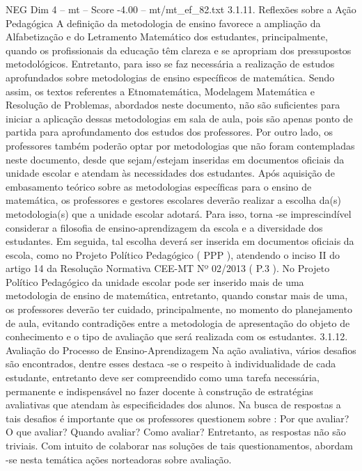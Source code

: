 \begin{textsample}{NEG Dim 4 – mt – Score -4.00 – mt/mt\_ef\_82.txt}  \label{ex:f4_neg_112}
3.1.11.
Reflexões sobre a Ação Pedagógica A definição da metodologia de ensino favorece a ampliação da Alfabetização e do Letramento Matemático dos estudantes, principalmente, quando os profissionais da educação têm clareza e se apropriam dos pressupostos metodológicos.
Entretanto, para isso se faz necessária a realização de estudos aprofundados sobre metodologias de ensino específicos de matemática.
Sendo assim, os textos referentes a Etnomatemática, Modelagem Matemática e Resolução de Problemas, abordados neste documento, não são suficientes para iniciar a aplicação dessas metodologias em sala de aula, pois são apenas ponto de partida para aprofundamento dos estudos dos professores.
Por outro lado, os professores também poderão optar por metodologias que não foram contempladas neste documento, desde que sejam/estejam inseridas em documentos oficiais da unidade escolar e atendam às necessidades dos estudantes.
Após aquisição de embasamento teórico sobre as metodologias específicas para o ensino de matemática, os professores e gestores escolares deverão realizar a escolha da(s) metodologia(s) que a unidade escolar adotará.
Para isso, torna -se imprescindível considerar a filosofia de ensino-aprendizagem da escola e a diversidade dos estudantes.
Em seguida, tal escolha deverá ser inserida em documentos oficiais da escola, como no Projeto Político Pedagógico ( PPP ), atendendo o inciso II do artigo 14 da Resolução Normativa CEE-MT Nº 02/2013 ( P.3 ).
No Projeto Político Pedagógico da unidade escolar pode ser inserido mais de uma metodologia de ensino de matemática, entretanto, quando constar mais de uma, os professores deverão ter cuidado, principalmente, no momento do planejamento de aula, evitando contradições entre a metodologia de apresentação do objeto de conhecimento e o tipo de avaliação que será realizada com os estudantes. 3.1.12.
Avaliação do Processo de Ensino-Aprendizagem Na ação avaliativa, vários desafios são encontrados, dentre esses destaca -se o respeito à individualidade de cada estudante, entretanto deve ser compreendido como uma tarefa necessária, permanente e indispensável no fazer docente à construção de estratégias avaliativas que atendam às especificidades dos alunos.
Na busca de respostas a tais desafios é importante que os professores questionem sobre : Por que avaliar?
O que avaliar?
Quando avaliar?
Como avaliar?
Entretanto, as respostas não são triviais.
Com intuito de colaborar nas soluções de tais questionamentos, abordam -se nesta temática ações norteadoras sobre avaliação.

\end{textsample}
